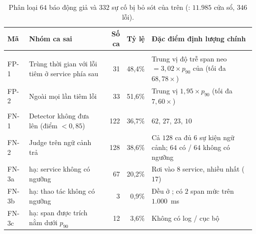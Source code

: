 \begin{table}[H]
  \centering
  \caption[Phân loại ca sai của CTAV trên tập test]{Phân loại $64$ báo động giả và $332$ sự cố bị bỏ sót của \CTAV{} trên  (: $11.985$ cửa sổ, $346$ lỗi).}
  \label{tab:ch7-ca-sai-ctav}
  \tblfont
  \tblsetup
  \setlength{\tabcolsep}{3.5pt}
  \begin{tabularx}{\linewidth}{|>{\raggedright\arraybackslash}p{1.2cm}|>{\raggedright\arraybackslash}p{4.3cm}|r|r|Y|}
    \hline
    \textbf{Mã} & \textbf{Nhóm ca sai} & \textbf{Số ca} & \textbf{Tỷ lệ} & \textbf{Đặc điểm định lượng chính} \\
    \hline
     \\
    \hline
    FP-1 & Trùng thời gian với lỗi tiêm ở service phía sau & 31 & 48,4\% & Trung vị độ trễ span neo $= 3{,}02 \times p_{90}$ của  (tối đa $68{,}78\times$) \\
    \hline
    FP-2 & Ngoài mọi lần tiêm lỗi & 33 & 51,6\% & Trung vị $1{,}95 \times p_{90}$ (tối đa $7{,}60\times$) \\
    \hline
     \\
    \hline
    FN-1 & Detector không đưa lên  (điểm $< 0{,}85$) & 122 & 36,7\% &  $62$,  $27$,  $23$,  $10$ \\
    \hline
    FN-2 & Judge trên ngữ cảnh  trả  & 128 & 38,6\% & Cả $128$ ca đủ $6$ sự kiện ngữ cảnh; $64$ có / $64$ không có ngưỡng  \\
    \hline
    FN-3a &  hạ: service không có ngưỡng  & 67 & 20,2\% & Rơi vào $8$ service, nhiều nhất  ($17$) \\
    \hline
    FN-3b &  hạ: thao tác không có ngưỡng  & 3 & 0,9\% & Đều ở ; có $2$ span mức  trên $1.000$~ms \\
    \hline
    FN-3c &  hạ: span được trích nằm dưới $p_{90}$ & 12 & 3,6\% & Không có log / cục bộ \\
    \hline
  \end{tabularx}
\end{table}

